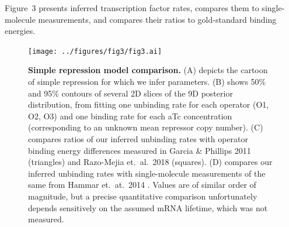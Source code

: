 Figure~3 presents inferred transcription factor rates, compares them to
single-molecule measurements, and compares their ratios to gold-standard binding
energies.
\begin{figure}%
\centering
\texttt{[image: ../figures/fig3/fig3.ai]}
\caption{\textbf{Simple repression model comparison.}
(A) depicts the cartoon of simple repression for which we infer parameters.
 (B) shows 50\% and 95\%
contours of several 2D slices of the 9D posterior distribution, from fitting one
unbinding rate for each operator (O1, O2, O3) and one binding rate for each aTc
concentration (corresponding to an unknown mean repressor copy number). (C)
compares ratios of our inferred unbinding rates with operator binding energy
differences measured in Garcia \& Phillips 2011 (triangles) and Razo-Mejia et.\
al.\ 2018 (squares). (D) compares our inferred unbinding rates with
single-molecule measurements of the same from Hammar et.\ at.\ 2014
\mmnote{Johan Elf's group}. Values are of similar order of magnitude, but a
precise quantitative comparison unfortunately depends sensitively on the assumed
mRNA lifetime, which was not measured.}
\label{fig3:kR_inferences}
\end{figure}

